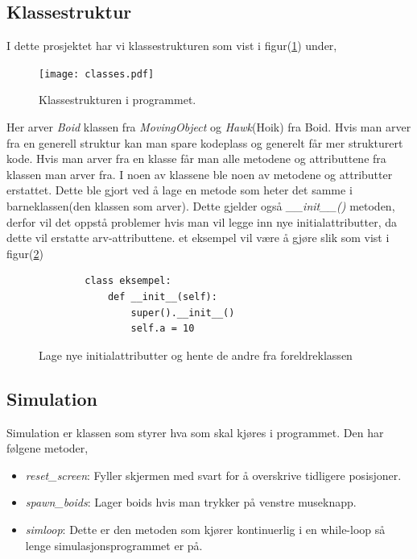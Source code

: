 \documentclass[10pt]{article}
\begin{document}
{\subsection{Klassestruktur}
I dette prosjektet har vi klassestrukturen som vist i figur(\ref{klassestrukturen}) under,
\begin{figure}[hbt!]
{\centering
    \texttt{[image: classes.pdf]}
    \caption{Klassestrukturen i programmet.}
    \label{klassestrukturen}
\par}
\end{figure}

Her arver \emph{Boid} klassen fra \emph{MovingObject} og \emph{Hawk}(Hoik) fra Boid. Hvis man arver fra en generell struktur kan man spare kodeplass og generelt får mer strukturert kode. Hvis man arver fra en klasse får man alle metodene og attributtene fra klassen man arver fra. I noen av klassene ble noen av metodene og attributter erstattet. Dette ble gjort ved å lage en metode som heter det samme i barneklassen(den klassen som arver). Dette gjelder også \emph{\_\_init\_\_()} metoden, derfor vil det oppstå problemer hvis man vil legge inn nye initialattributter, da dette vil erstatte arv-attributtene. et eksempel vil være å gjøre slik som vist i figur(\ref{nye_att})

\begin{figure}[hbt!]
    \begin{lstlisting}
        class eksempel:
            def __init__(self):
                super().__init__()
                self.a = 10
    \end{lstlisting}
\caption{Lage nye initialattributter og hente de andre fra foreldreklassen}
\label{nye_att}
\end{figure}

\subsection{Simulation}

Simulation er klassen som styrer hva som skal kjøres i programmet. Den har følgene metoder,\\

\begin{itemize}
    \item \emph{reset\_screen}: Fyller skjermen med svart for å overskrive tidligere posisjoner.
    \item \emph{spawn\_boids}: Lager boids hvis man trykker på venstre museknapp.
    \item \emph{simloop}: Dette er den metoden som kjører kontinuerlig i en while-loop så lenge simulasjonsprogrammet er på.
\end{itemize}

}
\end{document}
